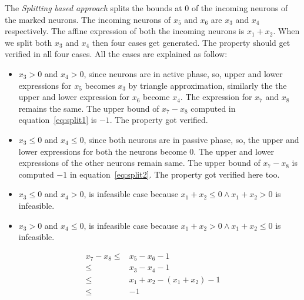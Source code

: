 The {\em Splitting based approach} splits the bounds at $0$ of the incoming neurons of the marked neurons. 
The incoming neurons of $x_5$ and $x_6$ are $x_3$ and $x_4$ respectively. 
The affine expression of both the incoming neurons is $x_1+x_2$. 
When we split both $x_3$ and $x_4$ then four cases get generated. The property should get verified in all four cases. 
All the cases are explained as follow: 
\begin{itemize}
    \item $x_3 > 0$ and $x_4 > 0$, since neurons are in active phase, so, upper and lower expressions for $x_5$ 
    becomes $x_3$ by triangle approximation, similarly the the upper and lower expression for $x_6$ become $x_4$. 
    The expression for $x_7$ and $x_8$ remains the same. The upper bound of $x_7 - x_8$ computed in equation~\ref{eq:split1} is $-1$. 
    The property got verified.   
    \item $x_3 \leq 0$ and $x_4 \leq 0$, since both neurons are in passive phase, so, the upper and lower expressions 
        for both the neurons become $0$. The upper and lower expressions of the other neurons remain same. 
        The upper bound of $x_7 - x_8$ is computed $-1$ in equation~\ref{eq:split2}. The property got verified here too. 
    \item $x_3 \leq 0$ and $x_4 > 0$, is infeasible case because $x_1+x_2 \leq 0 \land x_1 + x_2 > 0$ is infeasible. 
    \item $x_3 > 0$ and $x_4 \leq 0$, is infeasible case because $x_1+x_2 > 0 \land x_1 + x_2 \leq 0$ is infeasible. 
\end{itemize}

\begin{equation}
    \begin{aligned}
        x_7 - x_8 \leq & x_5 - x_6 - 1 \\
       \leq & x_3 - x_4 -1 \\
       \leq & x_1 + x_2 -(x_1+x_2) -1 \\
       \leq & -1 
    \end{aligned}
    \label{eq:split1}
\end{equation}

